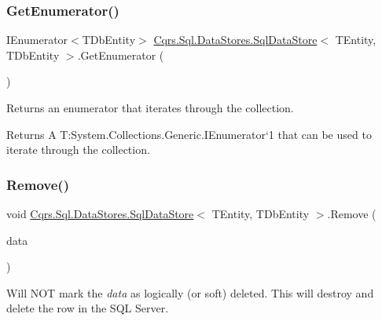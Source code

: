 \subsubsection{\texorpdfstring{Get\+Enumerator()}{GetEnumerator()}}
{\footnotesize\ttfamily I\+Enumerator$<$T\+Db\+Entity$>$ \hyperlink{classCqrs_1_1Sql_1_1DataStores_1_1SqlDataStore}{Cqrs.\+Sql.\+Data\+Stores.\+Sql\+Data\+Store}$<$ T\+Entity, T\+Db\+Entity $>$.Get\+Enumerator (\begin{DoxyParamCaption}{ }\end{DoxyParamCaption})}



Returns an enumerator that iterates through the collection. 

\begin{DoxyReturn}{Returns}
A T\+:\+System.\+Collections.\+Generic.\+I\+Enumerator`1 that can be used to iterate through the collection. 
\end{DoxyReturn}
\mbox{\label{classCqrs_1_1Sql_1_1DataStores_1_1SqlDataStore_ada15bdc873b3e4be8ff9a734d84562fb_ada15bdc873b3e4be8ff9a734d84562fb}} 
\subsubsection{\texorpdfstring{Remove()}{Remove()}}
{\footnotesize\ttfamily void \hyperlink{classCqrs_1_1Sql_1_1DataStores_1_1SqlDataStore}{Cqrs.\+Sql.\+Data\+Stores.\+Sql\+Data\+Store}$<$ T\+Entity, T\+Db\+Entity $>$.Remove (\begin{DoxyParamCaption}\item[{T\+Entity}]{data }\end{DoxyParamCaption})}



Will N\+OT mark the {\itshape data}  as logically (or soft) deleted. This will destroy and delete the row in the S\+QL Server. 

\mbox{\label{classCqrs_1_1Sql_1_1DataStores_1_1SqlDataStore_a5d85a9e627c74a25ef536364a6d60602_a5d85a9e627c74a25ef536364a6d60602}} 
